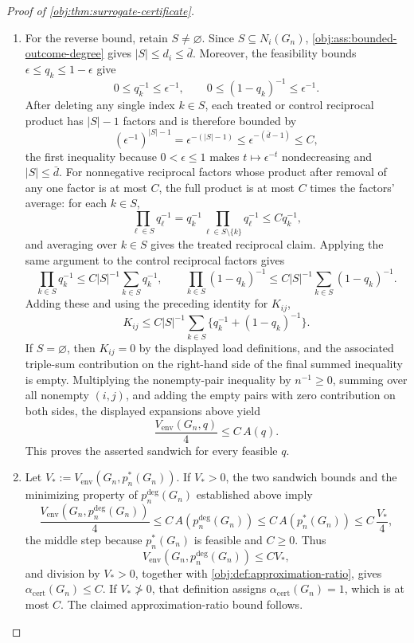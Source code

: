 \documentclass[11pt]{article}
\begin{document}
\begin{proof}[Proof of \cref{obj:thm:surrogate-certificate}]
\begin{enumerate}
\item For the reverse bound, retain \(S\neq\varnothing\).  Since
\(S\subseteq N_i(G_n)\), \cref{obj:ass:bounded-outcome-degree}
gives \(|S|\leq d_i\le\bar d\).  Moreover, the feasibility bounds \(\epsilon\le q_k\le1-\epsilon\) give
\[
0\leq q_k^{-1}\leq\epsilon^{-1},
\qquad
0\leq (1-q_k)^{-1}\leq\epsilon^{-1} .
\]
After deleting any single index \(k\in S\), each treated or control reciprocal product has \(|S|-1\) factors and is therefore bounded by
\[
(\epsilon^{-1})^{|S|-1}
=\epsilon^{-(|S|-1)}
 \leq \epsilon^{-(\bar d-1)}
 \leq C,
\]
the first inequality because \(0<\epsilon\le1\) makes \(t\mapsto\epsilon^{-t}\) nondecreasing and \(|S|\le\bar d\).
For nonnegative reciprocal factors whose product after removal of any one factor is at
most \(C\), the full product is at most \(C\) times the factors' average: for each \(k\in S\),
\[
\prod_{\ell\in S}q_\ell^{-1}
=q_k^{-1}\prod_{\ell\in S\setminus\{k\}}q_\ell^{-1}
\le Cq_k^{-1},
\]
and averaging over \(k\in S\) gives the treated reciprocal claim.  Applying the same argument to the control reciprocal factors gives
\[
\prod_{k\in S}q_k^{-1}
 \leq C|S|^{-1}\sum_{k\in S}q_k^{-1},
\qquad
\prod_{k\in S}(1-q_k)^{-1}
 \leq C|S|^{-1}\sum_{k\in S}(1-q_k)^{-1}.
\]
Adding these and using the preceding identity for \(K_{ij}\),
\[
K_{ij}\leq
C|S|^{-1}\sum_{k\in S}\{q_k^{-1}+(1-q_k)^{-1}\}.
\]
If \(S=\varnothing\), then \(K_{ij}=0\) by the displayed load definitions, and the associated triple-sum contribution on the
right-hand side of the final summed inequality is empty.  Multiplying the nonempty-pair inequality by
\(n^{-1}\geq0\), summing over all nonempty \((i,j)\), and adding the empty pairs with zero contribution on both sides, the displayed
expansions above yield
\[
\frac{V_{\mathrm{env}}(G_n,q)}4\leq C\,A(q).
\]
This proves the asserted sandwich for every feasible \(q\).

\item Let \(V_*:=V_{\mathrm{env}}(G_n,p_n^*(G_n))\).  If \(V_*>0\), the
two sandwich bounds and the minimizing property of \(p_n^{\deg}(G_n)\) established above imply
\[
\frac{V_{\mathrm{env}}\!\left(G_n,p_n^{\deg}(G_n)\right)}4
 \leq C\,A(p_n^{\deg}(G_n))
 \leq C\,A(p_n^*(G_n))
 \leq C\,\frac{V_*}{4},
\]
the middle step because \(p_n^*(G_n)\) is feasible and \(C\ge0\).  Thus
\[
V_{\mathrm{env}}\!\left(G_n,p_n^{\deg}(G_n)\right)\leq C V_*,
\]
and division by \(V_*>0\), together with \cref{obj:def:approximation-ratio},
gives \(\alpha_{\mathrm{cert}}(G_n)\leq C\).  If \(V_*\not>0\), that
definition assigns \(\alpha_{\mathrm{cert}}(G_n)=1\), which is at most
\(C\).  The claimed approximation-ratio bound follows.
\end{enumerate}
\end{proof}




\end{document}
